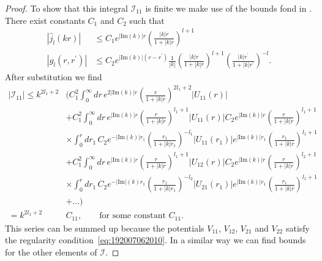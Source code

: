 \documentclass[mathpazo]{cicp}
\begin{document}
\begin{proof}
To show that this integral $\mathcal{I}_{11}$ is finite we make use of the bounds fond in \cite{Newton1982,Newton1960,Taylor2006}. There exist constants $C_{1}$ and $C_{2}$ such that
\begin{align}
	|\hat{j}_l(kr)| &\le C_1 e^{|\text{Im}(k)|r}\left(\frac{|k|r}{1+|k|r}\right)^{l+1} \\
	|g_l(r,r^\prime)| &\le C_2 e^{|\text{Im}(k)|(r-r^\prime)}\frac{1}{|k|} \left(\frac{|k|r}{1+|k|r} \right)^{l+1}\left(\frac{|k|r^\prime}{1+|k|r^\prime} \right)^{-l}.
	\label{eq:bounds}
\end{align}
After substitution we find
\begin{equation}
	\begin{aligned}
		|\mathcal{I}_{11}| \le k^{2l_1+2} &\bigg( C_1^2 \int_0^\infty dr \, e^{2|\text{Im}(k)|r}\left(\frac{r}{1+|k|r}\right)^{2l_1+2}|U_{11}(r)| \\
		& + C_1^2 \int_0^\infty dr \, e^{|\text{Im}(k)|r}\left(\frac{r}{1+|k|r}\right)^{l_1+1} |U_{11}(r) |
		C_2 e^{|\text{Im}(k)|r}\left(\frac{r}{1+|k|r}\right)^{l_1+1} \\
		& \times \int_0^r dr_1 \, C_2 e^{-|\text{Im}(k)|r_1}\left(\frac{r_1}{1+|k|r_1} \right)^{-l_1} |U_{11}(r_1)| e^{|\text{Im}(k)|r_1}\left(\frac{r_1}{1+|k|r}\right)^{l_1+1} \\
		&+ C_1^2 \int_0^\infty dr \, e^{ |\text{Im}(k)|r}\left(\frac{r}{1+|k|r}\right)^{l_1+1} |U_{12}(r) |
		C_2 e^{|\text{Im}(k)|r}\left(\frac{r}{1+|k|r}\right)^{l_2+1} \\
		& \times \int_0^r dr_1 \, C_2 e^{-|\text{Im}|(k)r_1}\left(\frac{r_1}{1+|k|r_1} \right)^{-l_2} |U_{21}(r_1)| e^{|\text{Im}(k)|r_1}\left(\frac{r_1}{1+|k|r}\right)^{l_1+1} \\
		& + \ldots \bigg) \\
		= k^{2l_1+2}& C_{11}, \qquad \text{for some constant } C_{11}.
	\end{aligned}
\end{equation}
This series can be summed up because the potentials $V_{11}$, $V_{12}$, $V_{21}$ and $V_{22}$ satisfy the regularity condition~\eqref{eq:192007062010}. In a similar way we can find bounds for the other elements of $\mathcal{I}$.


\end{proof}
\end{document}
